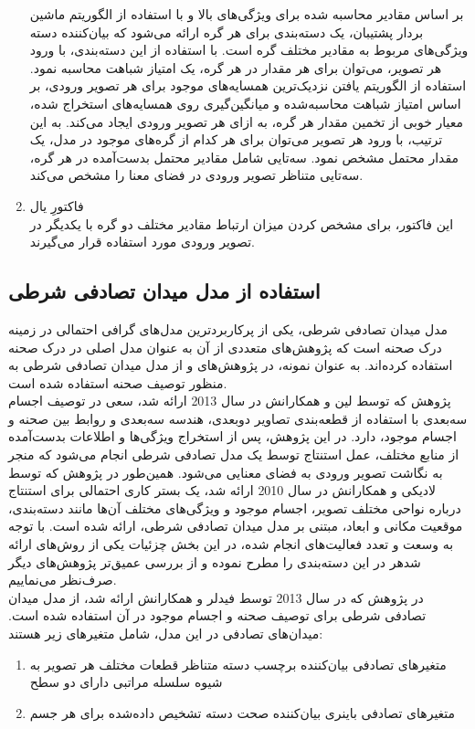 \begin{enumerate}
	بر اساس مقادیر محاسبه شده برای ویژگی‌های بالا و با استفاده از الگوریتم ماشین بردار پشتیبان، یک دسته‌بندی برای هر گره ارائه می‌شود که بیان‌کننده دسته ‌ویژگی‌های مربوط به مقادیر مختلف گره است. با استفاده از این دسته‌بندی، با ورود هر تصویر، می‌توان برای هر مقدار در هر گره، یک امتیاز شباهت محاسبه نمود. استفاده از الگوریتم یافتن نزدیک‌ترین همسایه‌های موجود برای هر تصویر ورودی، بر اساس امتیاز شباهت محاسبه‌شده و میانگین‌گیری روی همسایه‌های استخراج شده، معیار خوبی از تخمین مقدار هر گره، به ازای هر تصویر ورودی ایجاد می‌کند. به این ترتیب، با ورود هر تصویر می‌توان برای هر کدام از گره‌های موجود در مدل، یک مقدار محتمل مشخص نمود. سه‌تایی شامل مقادیر محتمل بدست‌آمده در هر گره، سه‌تایی متناظر تصویر ورودی در فضای معنا را مشخص می‌کند.
	\item فاکتورِ یال\\
	این فاکتور، برای مشخص کردن میزان ارتباط مقادیر مختلف دو گره با یکدیگر در تصویر ورودی مورد استفاده قرار می‌گیرند.
\end{enumerate}

\subsection[استفاده از مدل میدان تصادفی شرطی]{استفاده از مدل میدان تصادفی شرطی}
مدل میدان تصادفی شرطی، یکی از پرکاربردترین مدل‌های گرافی احتمالی در زمینه درک صحنه است که پژوهش‌های متعددی از آن به عنوان مدل اصلی در درک صحنه استفاده کرده‌اند. به عنوان نمونه، در پژوهش‌های 
\cite{Lin_2013_ICCV}
و
\cite{ladicky2010and}
از مدل میدان تصادفی شرطی به منظور توصیف صحنه استفاده شده است.\\
پژوهش \cite{Lin_2013_ICCV} که توسط لین و همکارانش در سال 2013 ارائه شد، سعی در توصیف اجسام سه‌بعدی با استفاده از قطعه‌بندی تصاویر دوبعدی، هندسه سه‌بعدی و روابط بین صحنه و اجسام موجود، دارد. در این پژوهش، پس از استخراج ویژگی‌ها و اطلاعات بدست‌آمده از منابع مختلف، عمل استنتاج توسط یک مدل تصادفی شرطی انجام می‌شود که منجر به نگاشت تصویر ورودی به فضای معنایی می‌شود. همین‌طور در پژوهش \cite{ladicky2010and} که توسط لادیکی و همکارانش در سال 2010 ارائه شد، یک بستر کاری احتمالی برای استنتاج درباره نواحی مختلف تصویر، اجسام موجود و ویژگی‌های مختلف آن‌ها مانند دسته‌بندی، موقعیت مکانی و ابعاد، مبتنی بر مدل میدان تصادفی شرطی، ارائه شده است. با توجه به وسعت و تعدد فعالیت‌های انجام شده، در این بخش چزئیات یکی از روش‌های ارائه شدهر در این دسته‌بندی را مطرح نموده و از بررسی عمیق‌تر پژوهش‌های دیگر صرف‌نظر می‌نماییم.
\\
در پژوهش\cite{fidler2013sentence} که در سال 2013 توسط فیدلر و همکارانش ارائه شد،
از مدل میدان تصادفی شرطی برای توصیف صحنه و اجسام موجود در آن استفاده شده است. میدان‌های تصادفی در این مدل، شامل متغیرهای زیر هستند:
\begin{enumerate}
	\item  متغیرهای تصادفی بیان‌کننده برچسب دسته متناظر قطعات مختلف هر تصویر به شیوه سلسله مراتبی دارای دو سطح
	\item متغیرهای تصادفی باینری بیان‌کننده صحت دسته‌ تشخیص داده‌شده برای هر جسم
\end{enumerate}

